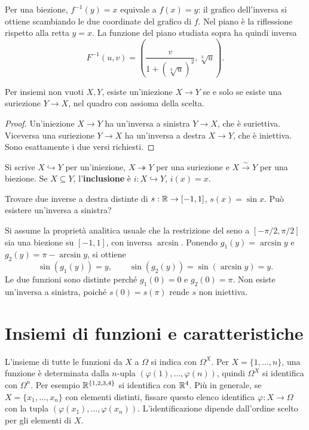 Per una biezione, $f^{-1}(y)=x$ equivale a $f(x)=y$: il grafico dell'inversa si ottiene scambiando le due coordinate del grafico di $f$. Nel piano è la riflessione rispetto alla retta $y=x$. La funzione del piano studiata sopra ha quindi inversa
\[
F^{-1}(u,v)=\left(\frac{v}{1+(\sqrt[3]u)^2},\sqrt[3]u\right).
\]

\begin{corollario}
Per insiemi non vuoti $X,Y$, esiste un'iniezione $X\to Y$ se e solo se esiste una suriezione $Y\to X$, nel quadro con assioma della scelta.
\end{corollario}
\begin{proof}
Un'iniezione $X\to Y$ ha un'inversa a sinistra $Y\to X$, che è suriettiva. Viceversa una suriezione $Y\to X$ ha un'inversa a destra $X\to Y$, che è iniettiva. Sono esattamente i due versi richiesti.
\end{proof}

Si scrive $X\hookrightarrow Y$ per un'iniezione, $X\twoheadrightarrow Y$ per una suriezione e $X\xrightarrow{\sim}Y$ per una biezione. Se $X\subseteq Y$, l'\textbf{inclusione} è $i:X\hookrightarrow Y$, $i(x)=x$.

\begin{esercizio}
Trovare due inverse a destra distinte di $s:\mathbb{R}\to[-1,1]$, $s(x)=\sin x$. Può esistere un'inversa a sinistra?
\end{esercizio}
\begin{svolgimento}
Si assume la proprietà analitica usuale che la restrizione del seno a $[-\pi/2,\pi/2]$ sia una biezione su $[-1,1]$, con inversa $\arcsin$. Ponendo $g_1(y)=\arcsin y$ e $g_2(y)=\pi-\arcsin y$, si ottiene
\[
\sin(g_1(y))=y,\qquad \sin(g_2(y))=\sin(\arcsin y)=y.
\]
Le due funzioni sono distinte perché $g_1(0)=0$ e $g_2(0)=\pi$. Non esiste un'inversa a sinistra, poiché $s(0)=s(\pi)$ rende $s$ non iniettiva.
\end{svolgimento}

\section{Insiemi di funzioni e caratteristiche}
\begin{definizione}
L'insieme di tutte le funzioni da $X$ a $\Omega$ si indica con $\Omega^X$. Per $X=\{1,\ldots,n\}$, una funzione è determinata dalla $n$-upla $(\varphi(1),\ldots,\varphi(n))$, quindi $\Omega^X$ si identifica con $\Omega^n$. Per esempio $\mathbb{R}^{\{1,2,3,4\}}$ si identifica con $\mathbb{R}^4$. Più in generale, se $X=\{x_1,\ldots,x_n\}$ con elementi distinti, fissare questo elenco identifica $\varphi:X\to\Omega$ con la tupla $(\varphi(x_1),\ldots,\varphi(x_n))$. L’identificazione dipende dall’ordine scelto per gli elementi di $X$.
\end{definizione}

